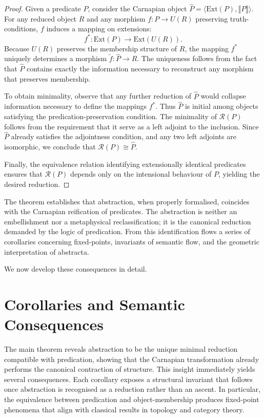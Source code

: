 \documentclass[12pt,letterpaper]{article}
\begin{document}
\begin{proof}
Given a predicate $P$, consider the Carnapian object $\hat{P} = \langle \mathrm{Ext}(P), \llbracket P \rrbracket \rangle$. For any reduced object $R$ and any morphism $f : P \to U(R)$ preserving truth-conditions, $f$ induces a mapping on extensions:
\[
f^\ast : \mathrm{Ext}(P) \to \mathrm{Ext}(U(R)).
\]
Because $U(R)$ preserves the membership structure of $R$, the mapping $f^\ast$ uniquely determines a morphism $\tilde{f} : \hat{P} \to R$. The uniqueness follows from the fact that $\hat{P}$ contains exactly the information necessary to reconstruct any morphism that preserves membership.

To obtain minimality, observe that any further reduction of $\hat{P}$ would collapse information necessary to define the mappings $f^\ast$. Thus $\hat{P}$ is initial among objects satisfying the predication-preservation condition. The minimality of $\mathcal{R}(P)$ follows from the requirement that it serve as a left adjoint to the inclusion. Since $\hat{P}$ already satisfies the adjointness condition, and any two left adjoints are isomorphic, we conclude that $\mathcal{R}(P) \cong \hat{P}$.

Finally, the equivalence relation identifying extensionally identical predicates ensures that $\mathcal{R}(P)$ depends only on the intensional behaviour of $P$, yielding the desired reduction.
\end{proof}

The theorem establishes that abstraction, when properly formalised, coincides with the Carnapian reification of predicates. The abstraction is neither an embellishment nor a metaphysical reclassification; it is the canonical reduction demanded by the logic of predication. From this identification flows a series of corollaries concerning fixed-points, invariants of semantic flow, and the geometric interpretation of abstracta.

We now develop these consequences in detail.

\section{Corollaries and Semantic Consequences}

The main theorem reveals abstraction to be the unique minimal reduction compatible with predication, showing that the Carnapian transformation already performs the canonical contraction of structure. This insight immediately yields several consequences. Each corollary exposes a structural invariant that follows once abstraction is recognised as a reduction rather than an ascent. In particular, the equivalence between predication and object-membership produces fixed-point phenomena that align with classical results in topology and category theory.
\end{document}
